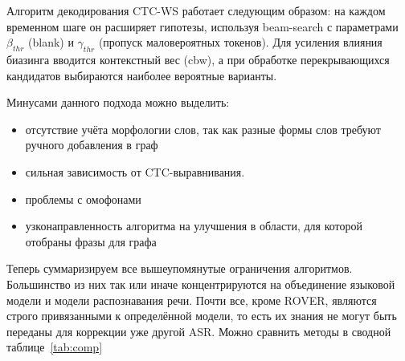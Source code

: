 Алгоритм декодирования CTC-WS работает следующим образом: на каждом временном шаге он расширяет гипотезы, используя beam-search с параметрами $\beta_{thr}$ (blank) и $\gamma_{thr}$ (пропуск маловероятных токенов).
Для усиления влияния биазинга вводится контекстный вес (cbw), а при обработке перекрывающихся кандидатов выбираются наиболее вероятные варианты.

Минусами данного подхода можно выделить:
\begin{itemize}
  \item отсутствие учёта морфологии слов, так как разные формы слов требуют ручного добавления в граф
  \item сильная зависимость от CTC-выравнивания.
  \item проблемы с омофонами
  \item узконаправленность алгоритма на улучшения в области, для которой отобраны фразы для графа
\end{itemize}

Теперь суммаризируем все вышеупомянутые ограничения алгоритмов.
Большинство из них так или иначе концентрируются на объединение языковой модели и модели распознавания речи.
Почти все, кроме ROVER, являются строго привязанными к определённой модели, то есть их знания не могут быть переданы для коррекции уже другой ASR.
Можно сравнить методы в сводной таблице~\ref{tab:comp}

